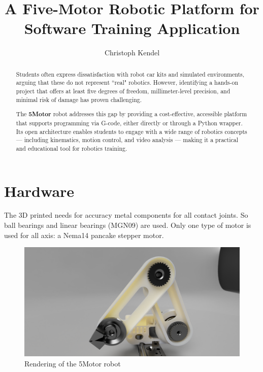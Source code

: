 \documentclass[12pt,twoside,a4paper]{article}
\title{A  Five-Motor Robotic Platform \linebreak for Software Training Application}
\author{Christoph Kendel}
\begin{document}
    \maketitle
    \begin{abstract}
Students often express dissatisfaction with robot car kits and  simulated environments, arguing that these do not represent ``real" robotics. However, identifying a hands-on project that offers at least five degrees of freedom, millimeter-level precision, and minimal risk of damage has proven challenging.

The  {\bf 5Motor}  robot addresses this gap by providing a cost-effective, accessible platform that supports programming via G-code, either directly or through a Python wrapper. Its open architecture enables students to engage with a wide range of robotics concepts  --- including kinematics, motion control, and video analysis  --- making it a practical and educational tool for robotics training.
    \end{abstract}

\pagebreak



\section{Hardware}

The 3D printed needs for accuracy metal components for all contact joints.  So ball bearings and  linear bearings (MGN09) are used. Only one type of motor is used
for all axis: a Nema14 pancake stepper motor.



\begin{figure}[h!]
\includegraphics[width=\linewidth]{Pictures/01_SideView_a.png}
\caption{Rendering of the 5Motor robot}
\end{figure}
\end{document}
